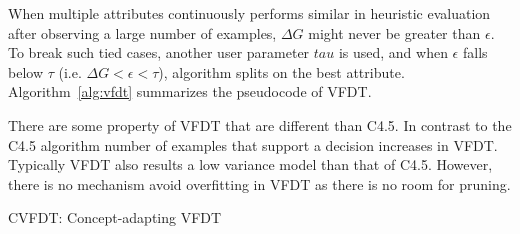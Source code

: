 \documentclass[a4paper, 11pt, oneside]{book}
\begin{document}
When multiple attributes continuously performs similar in heuristic evaluation after observing a large number of examples, $\Delta G$ might never be greater than $\epsilon$. To break such tied cases, another user parameter $tau$ is used, and when $\epsilon$ falls below $\tau$ (i.e. $\Delta G < \epsilon <\tau$), algorithm splits on the best attribute. Algorithm~\ref{alg:vfdt} summarizes the pseudocode of VFDT.

There are some property of VFDT that are different than C4.5. In contrast to the C4.5 algorithm number of examples that support a decision increases in VFDT. Typically VFDT also results a low variance model than that of C4.5. However, there is no mechanism avoid overfitting in VFDT as there is no room for pruning.

\begin{algorithm}[htbp]
    \DontPrintSemicolon
      
    \caption{CVFDT: Concept-adapting VFDT}
    \label{alg:cvfdt}
    
    
\end{algorithm}
\end{document}
